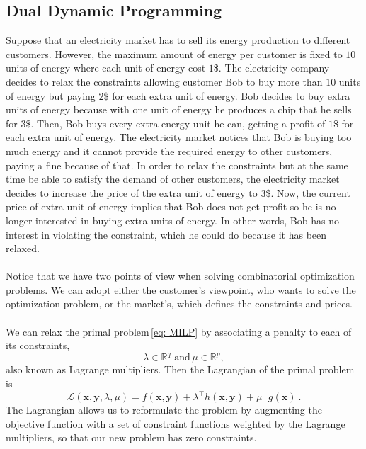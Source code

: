 \subsection{Dual Dynamic Programming}
Suppose that an electricity market has to sell its energy production to different customers. However, the maximum amount of energy per customer is fixed to $10$ units of energy where each unit of energy cost $1$\$. The electricity company decides to relax the constraints allowing customer Bob to buy more than $10$ units of energy but paying $2$\$ for each extra unit of energy. Bob decides to buy extra units of energy because with one unit of energy he produces a chip that he sells for $3$\$. Then, Bob buys every extra energy unit he can, getting a profit of $1$\$ for each extra unit of energy. The electricity market notices that Bob is buying too much energy and it cannot provide the required energy to other customers, paying a fine because of that. In order to relax the constraints but at the same time be able to satisfy the demand of other customers, the electricity market decides to increase the price of the extra unit of energy to $3$\$. Now, the current price of extra unit of energy implies that Bob does not get profit so he is no longer interested in buying extra units of energy. In other words, Bob has no interest in violating the constraint, which he could do because it has been relaxed.\\\\
Notice that we have two points of view when solving combinatorial optimization problems. We can adopt either the customer's viewpoint, who wants to solve the optimization problem, or the market's, which defines the constraints and prices.\\\\
We can relax the primal problem\,\eqref{eq: MILP} by associating a penalty to each of its constraints,
\begin{equation}
    \lambda\in\mathbb{R}^{q}\,\, \textrm{and} \, \mu\in\mathbb{R}^{p},
\end{equation}
also known as Lagrange multipliers. Then the Lagrangian of the primal problem is
\begin{equation}
    \mathcal{L}(\mathbf{x},\mathbf{y}, \lambda, \mu) = f(\mathbf{x}, \mathbf{y}) + \lambda^{\intercal}h(\mathbf{x},\mathbf{y}) + \mu^{\intercal}g(\mathbf{x})\ .
\end{equation}
The Lagrangian allows us to reformulate the problem by augmenting the objective function with a set of constraint functions weighted by the Lagrange multipliers, so that our new problem has zero constraints.
